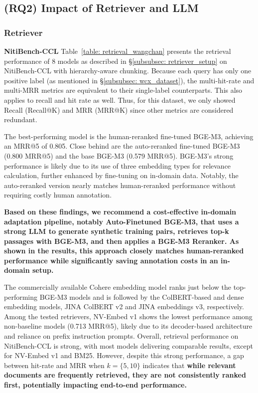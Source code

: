 \subsection{(RQ2) Impact of Retriever and LLM}
\label{subsec: rq2_result}

\subsubsection{Retriever}
\label{subsubsec: retriever_result}

\textbf{NitiBench-CCL} 
%
Table~\ref{table: retrieval_wangchan} presents the retrieval performance of 8 models as described in \S\ref{subsubsec: retriever_setup} on NitiBench-CCL with hierarchy-aware chunking. 
%
Because each query has only one positive label (as mentioned in \S\ref{subsubsec: wcx_dataset}), the multi-hit-rate and multi-MRR metrics are equivalent to their single-label counterparts. This also applies to recall and hit rate as well. Thus, for this dataset, we only showed Recall (Recall@K) and MRR (MRR@K) since other metrics are considered redundant.

The best-performing model is the human-reranked fine-tuned BGE-M3, achieving an MRR@5 of 0.805. 
%
Close behind are the auto-reranked fine-tuned BGE-M3 (0.800 MRR@5) and the base BGE-M3 (0.579 MRR@5). 
%
BGE-M3's strong performance is likely due to its use of three embedding types for relevance calculation, further enhanced by fine-tuning on in-domain data. 
%
Notably, the auto-reranked version nearly matches human-reranked performance without requiring costly human annotation. 
%

\textbf{Based on these findings, we recommend a cost-effective in-domain adaptation pipeline, notably Auto-Finetuned BGE-M3, that uses a strong LLM to generate synthetic training pairs, retrieves top-k passages with BGE-M3, and then applies a BGE-M3 Reranker. 
%
As shown in the results, this approach closely matches human-reranked performance while significantly saving annotation costs in an in-domain setup.
}

The commercially available Cohere embedding model ranks just below the top-performing BGE-M3 models and is followed by the ColBERT-based and dense embedding models, JINA ColBERT v2 and JINA embeddings v3, respectively. 
%
Among the tested retrievers, NV-Embed v1 shows the lowest performance among non-baseline models (0.713 MRR@5), likely due to its decoder-based architecture and reliance on prefix instruction prompts. 
%
Overall, retrieval performance on NitiBench-CCL is strong, with most models delivering comparable results, except for NV-Embed v1 and BM25. 
%
However, despite this strong performance, a gap between hit-rate and MRR when $k=\{5,10\}$ indicates that \textbf{while relevant documents are frequently retrieved, they are not consistently ranked first, potentially impacting end-to-end performance.}

